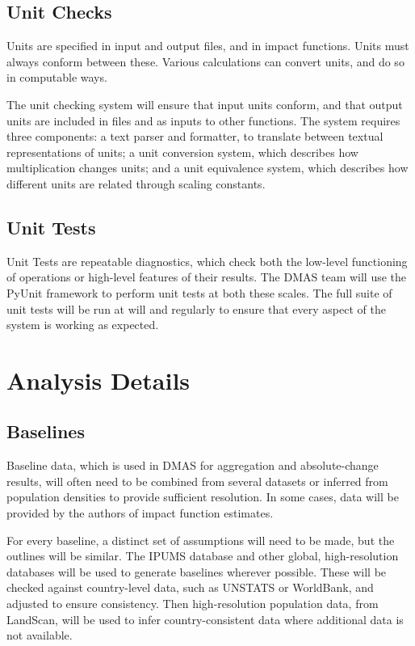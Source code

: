 \documentclass[12pt, oneside]{amsart}
\begin{document}
\subsection{Unit Checks}
\label{sec:unitchecks}

Units are specified in input and output files, and in impact
functions.  Units must always conform between these.  Various
calculations can convert units, and do so in computable ways.

The unit checking system will ensure that input units conform, and
that output units are included in files and as inputs to other
functions.  The system requires three components: a text parser and
formatter, to translate between textual representations of units; a
unit conversion system, which describes how multiplication changes
units; and a unit equivalence system, which describes how different
units are related through scaling constants.

\subsection{Unit Tests}
\label{sec:unittest}

Unit Tests are repeatable diagnostics, which check both the low-level
functioning of operations or high-level features of their results.
The DMAS team will use the PyUnit framework to perform unit tests at
both these scales.  The full suite of unit tests will be run at will
and regularly to ensure that every aspect of the system is working as
expected.

\section{Analysis Details}

\subsection{Baselines}
\label{sec:baselines}

Baseline data, which is used in DMAS for aggregation and
absolute-change results, will often need to be combined from several
datasets or inferred from population densities to provide sufficient
resolution.  In some cases, data will be provided by the authors of
impact function estimates.

For every baseline, a distinct set of assumptions will need to be
made, but the outlines will be similar.  The IPUMS database and other
global, high-resolution databases will be used to generate baselines
wherever possible.  These will be checked against country-level data,
such as UNSTATS or WorldBank, and adjusted to ensure consistency.
Then high-resolution population data, from LandScan, will be used to
infer country-consistent data where additional data is not available.
\end{document}
